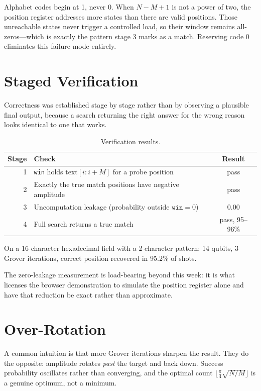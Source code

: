 \documentclass[11pt,a4paper]{article}
\begin{document}
Alphabet codes begin at 1, never 0. When $N-M+1$ is not a power of two, the
position register addresses more states than there are valid positions. Those
unreachable states never trigger a controlled load, so their window remains
all-zeros---which is exactly the pattern stage 3 marks as a match. Reserving code
0 eliminates this failure mode entirely.

\section{Staged Verification}

Correctness was established stage by stage rather than by observing a plausible
final output, because a search returning the right answer for the wrong reason
looks identical to one that works.

\begin{table}[h]
\centering
\caption{Verification results.}
\begin{tabular}{@{}rlc@{}}
\toprule
Stage & Check & Result \\
\midrule
1 & \texttt{win} holds $\text{text}[i:i+M]$ for a probe position & pass \\
2 & Exactly the true match positions have negative amplitude & pass \\
3 & Uncomputation leakage (probability outside $\texttt{win}=0$) & $\mathbf{0.00}$ \\
4 & Full search returns a true match & pass, 95--96\% \\
\bottomrule
\end{tabular}
\end{table}

On a 16-character hexadecimal field with a 2-character pattern: 14 qubits, 3
Grover iterations, correct position recovered in 95.2\% of shots.

The zero-leakage measurement is load-bearing beyond this week: it is what
licenses the browser demonstration to simulate the position register alone and
have that reduction be exact rather than approximate.

\section{Over-Rotation}

A common intuition is that more Grover iterations sharpen the result. They do the
opposite: amplitude rotates \emph{past} the target and back down. Success
probability oscillates rather than converging, and the optimal count
$\lfloor\frac{\pi}{4}\sqrt{N/M}\rfloor$ is a genuine optimum, not a minimum.
\end{document}
